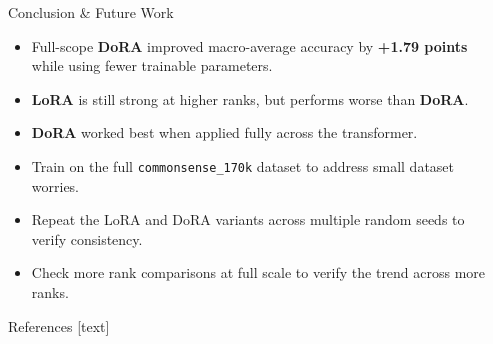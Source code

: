 \documentclass[final]{beamer}
\newlength{\sepwidth}
\newlength{\colwidth}
\newcommand{\separatorcolumn}{\begin{column}{\sepwidth}\end{column}}
\newcommand{\dora}{\textcolor{DoraemonBlue}{\textbf{DoRA}}}
\newcommand{\lora}{\textcolor{LoraxOrangeDark}{\textbf{LoRA}}}
\begin{document}
\begin{frame}[t]
\begin{columns}[t]
\begin{column}{\colwidth}
\vspace{-2ex}
\begin{block}{Conclusion \& Future Work}
\vspace{-2ex}
\vspace{-2ex}
\begin{itemize}
  \setlength{\itemsep}{0.15ex}
  \setlength{\parskip}{0pt}
  \item Full-scope \dora{} improved macro-average accuracy by \textbf{+1.79 points} while using fewer trainable parameters.
  \item \lora{} is still strong at higher ranks, but performs worse than \dora{}.
  \item \dora{} worked best when applied fully across the transformer.
\end{itemize}

\vspace{-2ex}
\vspace{-2ex}
\begin{itemize}
  \setlength{\itemsep}{0.15ex}
  \setlength{\parskip}{0pt}
  \item Train on the full \texttt{commonsense\_170k} dataset to address small dataset worries.
  \item Repeat the LoRA and DoRA variants across multiple random seeds to verify consistency.
  \item Check more rank comparisons at full scale to verify the trend across more ranks.
\end{itemize}
\vspace{-0.6ex}
\end{block}

\vspace{-2ex}
\begin{block}{References}
\vspace{-0.8ex}
\tiny
{}[text]
\nocite{nvlabsdora,transformers,hu2022lora,liu2024dora}


\vspace{-0.8ex}
\end{block}

\end{column}

\separatorcolumn
\end{columns}
\end{frame}
\end{document}
